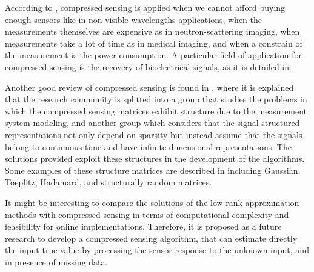     According to \cite{Rani18}, compressed sensing is applied when we cannot afford buying enough sensors like in non-visible wavelengths applications, when the measurements themselves are expensive as in neutron-scattering imaging, when measurements take a lot of time as in medical imaging, and when a constrain of the measurement is the power consumption.
    A particular field of application for compressed sensing is the recovery of bioelectrical signals, as it is detailed in \cite{Craven15}.
	 
    Another good review of compressed sensing is found in \cite{Duarte11}, where it is explained that the  research community is splitted into a group that studies the problems in which the compressed sensing matrices exhibit structure due to the measurement system modeling, and another group which considers that the signal structured representations not only depend on sparsity but instead assume that the signals belong to continuous time and have infinite-dimensional representations. The solutions provided exploit these structures in the development of the algorithms. Some examples of these structure matrices are described in \cite{Kezhi15} including Gaussian, Toeplitz, Hadamard, and structurally random matrices.
	 
    It might be interesting to compare the solutions of the low-rank approximation methods with compressed sensing in terms of computational complexity and feasibility for online implementations. 
    Therefore, it is proposed as a future research to develop a compressed sensing algorithm, that can estimate directly the input true value by processing the sensor response to the unknown input, and in presence of missing data. 
	

\color{black}


